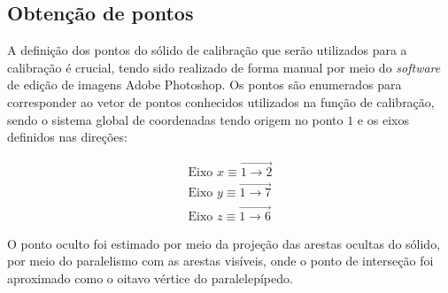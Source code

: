 \subsection{Obtenção de pontos}

A definição dos pontos do sólido de calibração que serão utilizados para a calibração é crucial, tendo sido realizado de forma manual por meio do \textit{software} de edição de imagens Adobe Photoshop. Os pontos são enumerados para corresponder ao vetor de pontos conhecidos utilizados na função de calibração, sendo o sistema global de coordenadas tendo origem no ponto $\mathit{1}$ e os eixos definidos nas direções:

\begin{align}
	\text{Eixo } x \equiv \overrightarrow{\mathit{1} \to \mathit{2}} \\ 
	\text{Eixo } y \equiv \overrightarrow{\mathit{1} \to \mathit{7}} \\
	\text{Eixo } z \equiv \overrightarrow{\mathit{1} \to \mathit{6}}
\end{align}

O ponto oculto foi estimado por meio da projeção das arestas ocultas do sólido, por meio do paralelismo com as arestas visíveis, onde o ponto de interseção foi aproximado como o oitavo vértice do paralelepípedo.

